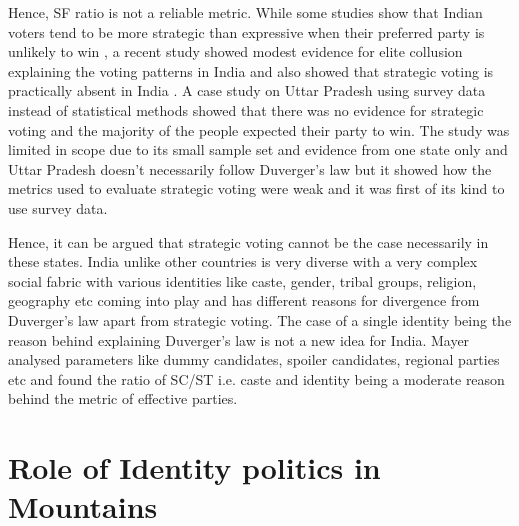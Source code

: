 Hence, SF ratio is not a reliable metric. While some studies show that Indian voters tend to be more strategic than expressive when their preferred party is unlikely to win \citep{choi2009strategic}, a recent study showed modest evidence for elite collusion explaining the voting patterns in India and also showed that strategic voting is practically absent in India \citep{ziegfeld2021accounts}. A case study on Uttar Pradesh \citep{heath2022so} using survey data instead of statistical methods showed that there was no evidence for strategic voting and the majority of the people expected their party to win. The study was limited in scope due to its small sample set and evidence from one state only and Uttar Pradesh doesn't necessarily follow Duverger's law but it showed how the metrics used to evaluate strategic voting were weak and it was first of its kind to use survey data. 

\vspace{0.3cm}

Hence, it can be argued that strategic voting cannot be the case necessarily in these states. India unlike other countries is very diverse with a very complex social fabric with various identities like caste, gender, tribal groups, religion, geography etc coming into play and has different reasons for divergence from Duverger's law apart from strategic voting. The case of a single identity being the reason behind explaining Duverger’s law is not a new idea \citep{mayer2013gross} for India. Mayer analysed parameters like dummy candidates, spoiler candidates, regional parties etc and found the ratio of SC/ST i.e. caste and identity being a moderate reason behind the metric of effective parties. 




\section{Role of Identity politics in Mountains}

